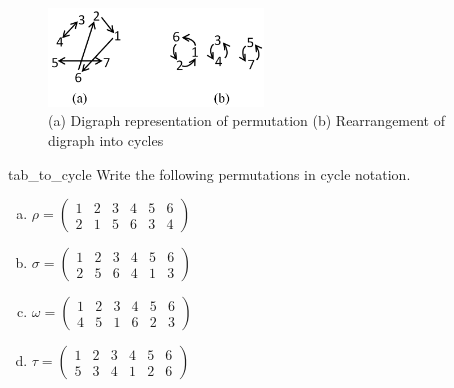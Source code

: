 \begin{figure}[ht]
\begin{center}
\includegraphics[width=2.25in]{images/cycle_rep.png}
\caption{(a) Digraph representation of permutation (b) Rearrangement of digraph into cycles}\label{permute:cycle_rep}
\end{center}
\end{figure}


\begin{exercise}{tab_to_cycle}
Write the following permutations in cycle notation.
\begin{multicols}{2}
\begin{enumerate}[(a)]
 
\item
$ \rho =
\begin{pmatrix}
1 & 2 & 3 & 4 & 5 & 6  \\
2 & 1 & 5 & 6 & 3 & 4 
\end{pmatrix}
$

\item
$ \sigma =
\begin{pmatrix}
1 & 2 & 3 & 4 & 5 & 6\\
2 & 5 & 6 & 4 & 1 & 3
\end{pmatrix}
$

\item
$ \omega =
\begin{pmatrix}
1 & 2 & 3 & 4 & 5 & 6 \\
4 & 5 & 1 & 6 & 2 & 3
\end{pmatrix}
$

\item
$ \tau =
\begin{pmatrix}
1 & 2 & 3 & 4 & 5 & 6 \\
5 & 3 & 4 & 1 & 2 & 6
\end{pmatrix}
$

\end{enumerate}
\end{multicols}
\end{exercise}

